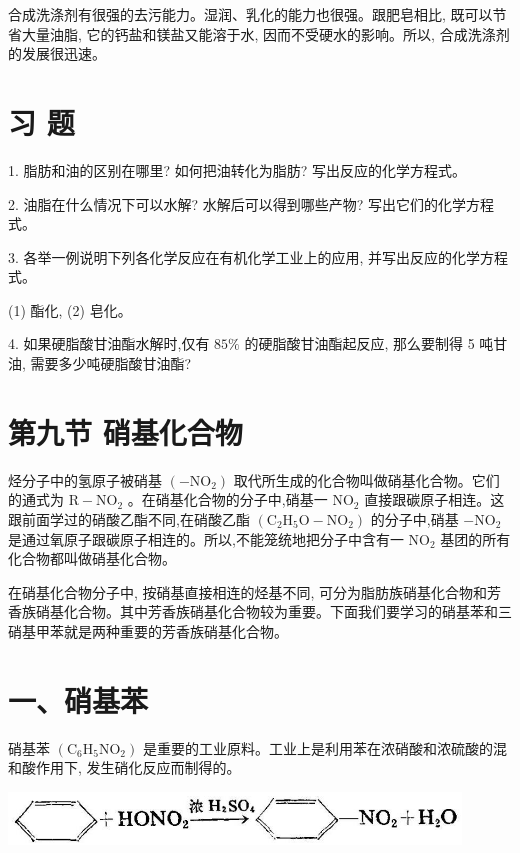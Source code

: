 \documentclass[10pt]{article}
\begin{document}
合成洗涤剂有很强的去污能力。湿润、乳化的能力也很强。跟肥皂相比, 既可以节省大量油脂, 它的钙盐和镁盐又能溶于水, 因而不受硬水的影响。所以, 合成洗涤剂的发展很迅速。

\section*{习 题}

1. 脂肪和油的区别在哪里? 如何把油转化为脂肪? 写出反应的化学方程式。

2. 油脂在什么情况下可以水解? 水解后可以得到哪些产物? 写出它们的化学方程式。

3. 各举一例说明下列各化学反应在有机化学工业上的应用, 并写出反应的化学方程式。

(1) 酯化, (2) 皂化。

4. 如果硬脂酸甘油酯水解时,仅有 \({85}\%\) 的硬脂酸甘油酯起反应, 那么要制得 5 吨甘油, 需要多少吨硬脂酸甘油酯?

\section*{第九节 硝基化合物}

烃分子中的氢原子被硝基 \(\left( {-{\mathrm{{NO}}}_{2}}\right)\) 取代所生成的化合物叫做硝基化合物。它们的通式为 \(\mathrm{R} - {\mathrm{{NO}}}_{2}\) 。在硝基化合物的分子中,硝基一 \({\mathrm{{NO}}}_{2}\) 直接跟碳原子相连。这跟前面学过的硝酸乙酯不同,在硝酸乙酯 \(\left( {{\mathrm{C}}_{2}{\mathrm{H}}_{5}\mathrm{O} - {\mathrm{{NO}}}_{2}}\right)\) 的分子中,硝基 \(- {\mathrm{{NO}}}_{2}\) 是通过氧原子跟碳原子相连的。所以,不能笼统地把分子中含有一 \({\mathrm{{NO}}}_{2}\) 基团的所有化合物都叫做硝基化合物。

在硝基化合物分子中, 按硝基直接相连的烃基不同, 可分为脂肪族硝基化合物和芳香族硝基化合物。其中芳香族硝基化合物较为重要。下面我们要学习的硝基苯和三硝基甲苯就是两种重要的芳香族硝基化合物。

\section*{一、硝基苯}

硝基苯 \(\left( {{\mathrm{C}}_{6}{\mathrm{H}}_{5}{\mathrm{{NO}}}_{2}}\right)\) 是重要的工业原料。工业上是利用苯在浓硝酸和浓硫酸的混和酸作用下, 发生硝化反应而制得的。

\begin{center}
\includegraphics[max width=0.9\textwidth]{images/01912d16-be99-77bb-9535-4f3ed8d9946f_149_596389.jpg}
\end{center}
\end{document}
